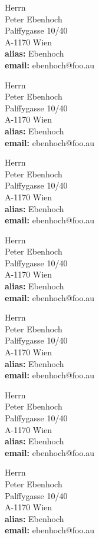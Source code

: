 \parbox{8cm}{
Herrn \\
Peter Ebenhoch \\
Palffygasse 10/40 \\
A-1170 Wien \\
{\bf alias:} Ebenhoch  \\
{\bf email:} ebenhoch@foo.au \\ }

\parbox{8cm}{
Herrn \\
Peter Ebenhoch \\
Palffygasse 10/40 \\
A-1170 Wien \\
{\bf alias:} Ebenhoch  \\
{\bf email:} ebenhoch@foo.au \\ }

\parbox{8cm}{
Herrn \\
Peter Ebenhoch \\
Palffygasse 10/40 \\
A-1170 Wien \\
{\bf alias:} Ebenhoch  \\
{\bf email:} ebenhoch@foo.au \\ }

\parbox{8cm}{
Herrn \\
Peter Ebenhoch \\
Palffygasse 10/40 \\
A-1170 Wien \\
{\bf alias:} Ebenhoch  \\
{\bf email:} ebenhoch@foo.au \\ }

\parbox{8cm}{
Herrn \\
Peter Ebenhoch \\
Palffygasse 10/40 \\
A-1170 Wien \\
{\bf alias:} Ebenhoch  \\
{\bf email:} ebenhoch@foo.au \\ }

\parbox{8cm}{
Herrn \\
Peter Ebenhoch \\
Palffygasse 10/40 \\
A-1170 Wien \\
{\bf alias:} Ebenhoch  \\
{\bf email:} ebenhoch@foo.au \\ }

\parbox{8cm}{
Herrn \\
Peter Ebenhoch \\
Palffygasse 10/40 \\
A-1170 Wien \\
{\bf alias:} Ebenhoch  \\
{\bf email:} ebenhoch@foo.au \\ }

